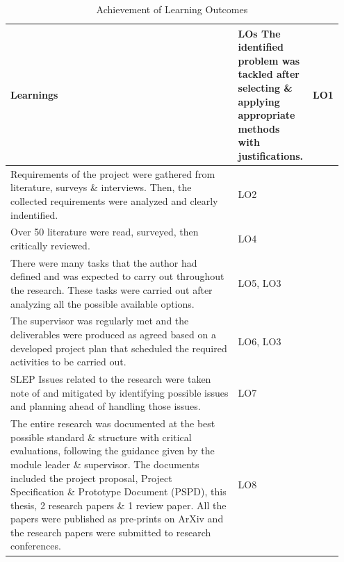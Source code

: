 \begin{longtable}{|p{0.8\linewidth}|p{0.1471\linewidth}|}
\caption{Achievement of Learning Outcomes}
\label{tab:achievement-learning-outcomes-table}
\\ 
\hline
\textbf{Learnings} & \textbf{LOs}\endfirsthead 
\hline
The identified problem was tackled after selecting \& applying appropriate methods with justifications. & LO1 \\
\hline
Requirements of the project were gathered from literature, surveys \& interviews. Then, the collected requirements were analyzed and clearly indentified. & LO2 \\
\hline
Over 50 literature were read, surveyed, then critically reviewed. & LO4 \\
\hline
There were many tasks that the author had defined and was expected to carry out throughout the research. These tasks were carried out after analyzing all the possible available options. & LO5, LO3 \\
\hline
The supervisor was regularly met and the deliverables were produced as agreed based on a developed project plan that scheduled the required activities to be carried out. & LO6, LO3 \\
\hline
SLEP Issues related to the research were taken note of and mitigated by identifying possible issues and planning ahead of handling those issues. & LO7 \\
\hline
The entire research was documented at the best possible standard \& structure with critical evaluations, following the guidance given by the module leader \& supervisor. The documents included the project proposal, Project Specification \& Prototype Document (PSPD), this thesis, 2 research papers \& 1 review paper. All the papers were published as pre-prints on ArXiv and the research papers were submitted to research conferences. & LO8 \\
\hline
\end{longtable}